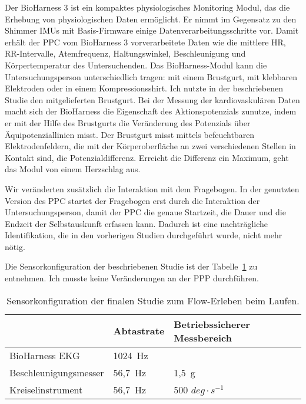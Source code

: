 Der BioHarness 3 ist ein kompaktes physiologisches Monitoring Modul, das die Erhebung von physiologischen Daten ermöglicht. Er nimmt im Gegensatz zu den Shimmer \acp{IMU} mit Basis-Firmware einige Datenverarbeitungsschritte vor. Damit erhält der \ac{PPC} vom BioHarness 3 vorverarbeitete Daten wie die mittlere HR, RR-Intervalle, Atemfrequenz, Haltungswinkel, Beschleunigung und Körpertemperatur des Untersuchenden. Das BioHarness-Modul kann die Untersuchungsperson unterschiedlich tragen: mit einem Brustgurt, mit klebbaren Elektroden oder in einem Kompressionsshirt. Ich nutzte in der beschriebenen Studie den mitgelieferten Brustgurt. Bei der Messung der kardiovaskulären Daten macht sich der BioHarness die Eigenschaft des Aktionspotenzials zunutze, indem er mit der Hilfe des Brustgurts die Veränderung des Potenzials über Äquipotenziallinien misst. Der Brustgurt misst mittels befeuchtbaren Elektrodenfeldern, die mit der Körperoberfläche an zwei verschiedenen Stellen in Kontakt sind, die Potenzialdifferenz. Erreicht die Differenz ein Maximum, geht das Modul von einem Herzschlag aus. 

Wir veränderten zusätzlich die Interaktion mit dem Fragebogen. In der genutzten Version des \ac{PPC} startet der Fragebogen erst durch die Interaktion der Untersuchungsperson, damit der \ac{PPC} die genaue Startzeit, die Dauer und die Endzeit der Selbstauskunft erfassen kann. Dadurch ist eine nachträgliche Identifikation, die in den vorherigen Studien durchgeführt wurde, nicht mehr nötig. 

Die Sensorkonfiguration der beschriebenen Studie ist der Tabelle~\ref{tab:sensorkonfiguration_3} zu entnehmen. Ich musste keine Veränderungen an der \ac{PPP} durchführen. 
\begin{table}
	[!htb] \caption[Sensorkonfiguration der finalen Studie zum Flow-Erleben beim Laufen.]{Sensorkonfiguration der finalen Studie zum Flow-Erleben beim Laufen.} \label{tab:sensorkonfiguration_3} 
	\begin{tabularx}
		{ 
		\textwidth}{p{} p{} p{}} \toprule & Abtastrate & Betriebssicherer Messbereich \\
		\midrule BioHarness \ac{EKG} & 1024~Hz & \\
		Beschleunigungsmesser & 56,7~Hz & 1,5~g \\
		Kreiselinstrument & 56,7~Hz & 500 $deg \cdot s^{-1}$ \\
		\bottomrule 
	\end{tabularx}
\end{table}


